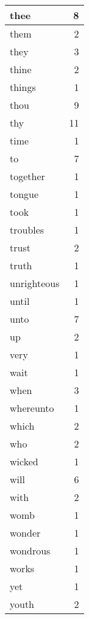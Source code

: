 \begin{center}
\begin{longtable}{l|r}
thee & 8 \\ \hline
them & 2 \\ \hline
they & 3 \\ \hline
thine & 2 \\ \hline
things & 1 \\ \hline
thou & 9 \\ \hline
thy & 11 \\ \hline
time & 1 \\ \hline
to & 7 \\ \hline
together & 1 \\ \hline
tongue & 1 \\ \hline
took & 1 \\ \hline
troubles & 1 \\ \hline
trust & 2 \\ \hline
truth & 1 \\ \hline
unrighteous & 1 \\ \hline
until & 1 \\ \hline
unto & 7 \\ \hline
up & 2 \\ \hline
very & 1 \\ \hline
wait & 1 \\ \hline
when & 3 \\ \hline
whereunto & 1 \\ \hline
which & 2 \\ \hline
who & 2 \\ \hline
wicked & 1 \\ \hline
will & 6 \\ \hline
with & 2 \\ \hline
womb & 1 \\ \hline
wonder & 1 \\ \hline
wondrous & 1 \\ \hline
works & 1 \\ \hline
yet & 1 \\ \hline
youth & 2 \\ \hline
\end{longtable}
\end{center}



\normalsize



